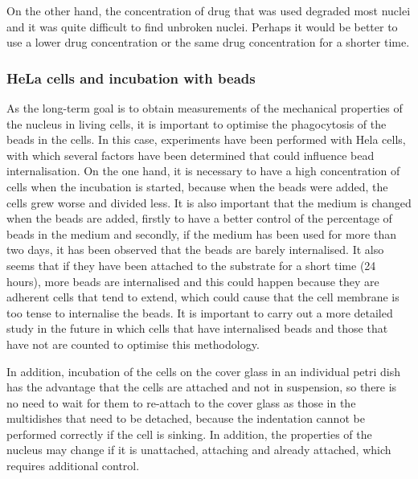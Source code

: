\documentclass[12pt, a4paper]{article} %
\begin{document}
\setlength{\parskip}{4mm} 

On the other hand, the concentration of drug that was used degraded most nuclei and it was quite difficult to find unbroken nuclei. Perhaps it would be better to use a lower drug concentration or the same drug concentration for a shorter time. 

\setlength{\parskip}{0mm}

\subsubsection{HeLa cells and incubation with beads}

As the long-term goal is to obtain measurements of the mechanical properties of the nucleus in living cells, it is important to optimise the phagocytosis of the beads in the cells. In this case, experiments have been performed with Hela cells, with which several factors have been determined that could influence bead internalisation. On the one hand, it is necessary to have a high concentration of cells when the incubation is started, because when the beads were added, the cells grew worse and divided less. It is also important that the medium is changed when the beads are added, firstly to have a better control of the percentage of beads in the medium and secondly, if the medium has been used for more than two days, it has been observed that the beads are barely internalised. It also seems that if they have been attached to the substrate for a short time (24 hours), more beads are internalised and this could happen because they are adherent cells that tend to extend, which could cause that the cell membrane is too tense to internalise the beads. It is important to carry out a more detailed study in the future in which cells that have internalised beads and those that have not are counted to optimise this methodology.

\setlength{\parskip}{4mm}

In addition, incubation of the cells on the cover glass in an individual petri dish has the advantage that the cells are attached and not in suspension, so there is no need to wait for them to re-attach to the cover glass as those in the multidishes that need to be detached, because the indentation cannot be performed correctly if the cell is sinking. In addition, the properties of the nucleus may change if it is unattached, attaching and already attached, which requires additional control.
\end{document}
